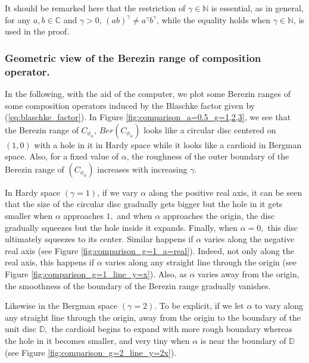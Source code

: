 \documentclass[12pt, reqno]{amsart}
\theoremstyle{definition}
\theoremstyle{remark}
\numberwithin{equation}{section}
\newcommand{\D}{\mathbb{D}}
\newcommand{\g}{\gamma}
\begin{document}
It should be remarked here that the restriction of $\gamma \in \mathbb{N}$ is essential, as in general, for any $a, b \in \mathbb{C}$ and $\gamma>0$, $(ab)^\gamma\neq a^\gamma b^\gamma$, while the equality holds when $\gamma \in \mathbb{N}$, is used in the proof.\\

\subsubsection{\bf Geometric view of the Berezin range of composition operator.}

    In the following, with the aid of the computer, we plot some Berezin ranges of some composition operators induced by the Blaschke factor given by (\ref{eq:blaschke_factor}).       
       In Figure \ref{fig:comparison_a=0.5_g=1,2,3}, we see that the Berezin range of $C_{\phi_\alpha},\,Ber\left(C_{\phi_\alpha}\right)$ looks like a circular disc centered on $(1,0)$ with a hole in it in Hardy space while it looks like a cardioid in Bergman space. Also, for a fixed value of $\alpha$, the roughness of the outer boundary of the Berezin range of $\left(C_{\phi_\alpha}\right)$ increases with increasing $\gamma.$\\
           \par
        In Hardy space $(\g=1)$, if we vary $\alpha$ along the positive real axis, it can be seen that the size of the circular disc gradually gets bigger but the hole in it gets smaller when $\alpha$ approaches $1,$ and when $\alpha$ approaches the origin,  the disc gradually squeezes but the hole inside it expands. Finally, when $\alpha=0,$ this disc ultimately squeezes to its center. Similar happens if $\alpha$ varies along the negative real axis (see Figure \ref{fig:comparison_g=1_a=real}). Indeed, not only along the real axis, this happens if $\alpha$ varies along any straight line through the origin (see Figure \ref{fig:comparison_g=1_line_y=x}). Also, as $\alpha$ varies away from the origin, the smoothness of the boundary of the Berezin range gradually vanishes. \\  
    \par
    
    Likewise in the Bergman space $(\g=2).$ To be explicit, if we let $\alpha$ to vary along any straight line through the origin, away from the origin to the boundary of the unit disc $\D,$ the cardioid begins to expand with more rough boundary whereas the hole in it becomes smaller, and very tiny when $\alpha$ is near the boundary of $\D$ (see Figure \ref{fig:comparison_g=2_line_y=2x}).\\   
    \par
    
\end{document}

